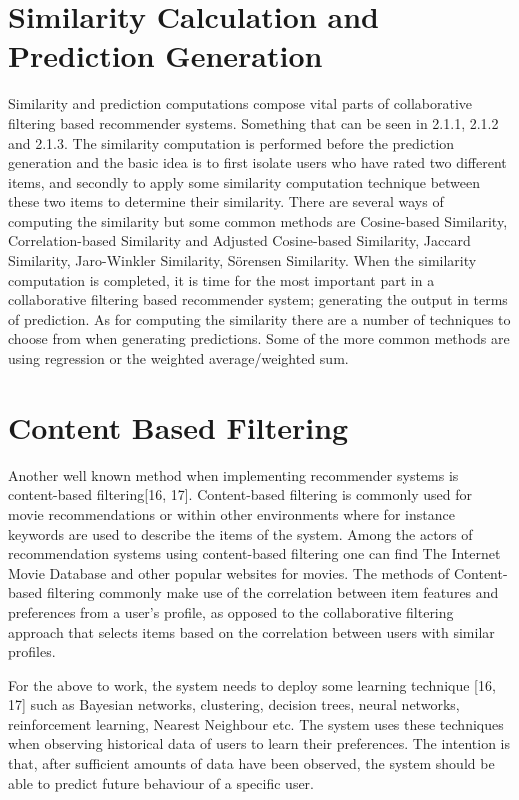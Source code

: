 \section{Similarity Calculation and Prediction Generation}
Similarity and prediction computations compose vital parts of collaborative filtering based recommender systems. Something that can be seen in 2.1.1, 2.1.2 and 2.1.3. The similarity computation is performed before the prediction generation and the basic idea is to first isolate users who have rated two different items, and secondly to apply some similarity computation technique between these two items to determine their similarity. There are several ways of computing the similarity but some common methods are Cosine-based Similarity, Correlation-based Similarity and Adjusted Cosine-based Similarity, Jaccard Similarity, Jaro-Winkler Similarity, Sörensen Similarity.
When the similarity computation is completed, it is time for the most important part in a collaborative filtering based recommender system; generating the output in terms of prediction. As for computing the similarity there are a number of techniques to choose from when generating predictions. Some of the more common methods are using regression or the weighted average/weighted sum.

\section{Content Based Filtering}\label{contentfiltering}
Another well known method when implementing recommender systems is content-based filtering[16, 17]. Content-based filtering is commonly used for movie recommendations or within other environments where for instance keywords are used to describe the items of the system. Among the actors of recommendation systems using content-based filtering one can find The Internet Movie Database and other popular websites for movies. The methods of Content-based filtering commonly make use of the correlation between item features and preferences from a user’s profile, as opposed to the collaborative filtering approach that selects items based on the correlation between users with similar profiles. 

For the above to work, the system needs to deploy some learning technique [16, 17] such as Bayesian networks, clustering, decision trees, neural networks, reinforcement learning, Nearest Neighbour etc. The system uses these techniques when observing historical data of users to learn their preferences. The intention is that, after sufficient amounts of data have been observed, the system should be able to predict future behaviour of a specific user.


